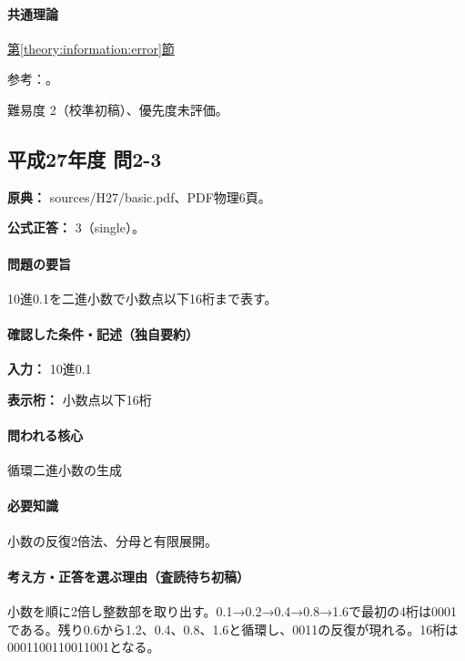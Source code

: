 \paragraph{共通理論} \hyperref[theory:information:error]{第\ref*{theory:information:error}節}

\par 参考：\cite{goldberg1991}。

\par 難易度 2（校準初稿）、優先度未評価。

\subsection{平成27年度 問2-3}
\label{q:h27-reg-basic-2-3}

\noindent\textbf{原典：} sources/H27/basic.pdf、PDF物理6頁。

\textbf{公式正答：} 3（single）。

\paragraph{問題の要旨} 10進0.1を二進小数で小数点以下16桁まで表す。

\paragraph{確認した条件・記述（独自要約）}\mbox{}\par

\noindent\textbf{入力：} 10進0.1\par

\noindent\textbf{表示桁：} 小数点以下16桁\par

\paragraph{問われる核心} 循環二進小数の生成

\paragraph{必要知識} 小数の反復2倍法、分母と有限展開。

\paragraph{考え方・正答を選ぶ理由（査読待ち初稿）} 小数を順に2倍し整数部を取り出す。0.1→0.2→0.4→0.8→1.6で最初の4桁は0001である。残り0.6から1.2、0.4、0.8、1.6と循環し、0011の反復が現れる。16桁は0001100110011001となる。

